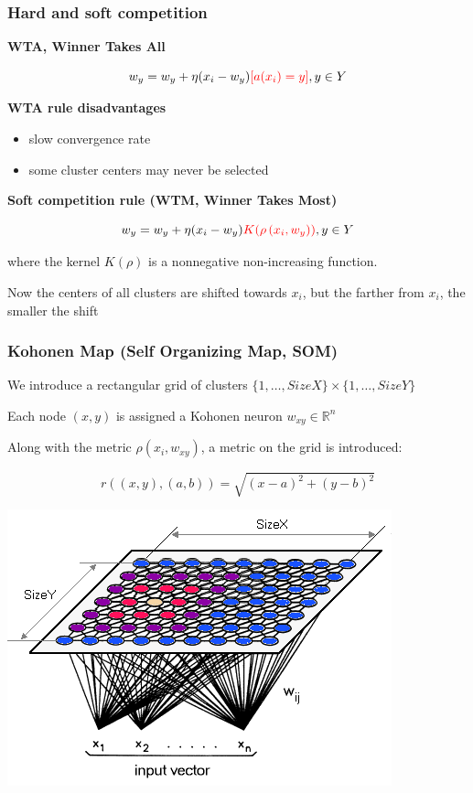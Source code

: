 \documentclass[fullscreen=true, bookmarks=true, hyperref={pdfencoding=unicode}]{beamer}
\begin{document}

\begin{frame}
\frametitle{Hard and soft competition}

   {\bf WTA, Winner Takes All}

   $$w_y = w_y + \eta(x_i-w_y){\color{red}[a(x_i)=y]}, y \in Y$$

   {\bf WTA rule disadvantages}
   \begin{itemize}
     \item slow convergence rate
     \item some cluster centers may never be selected
   \end{itemize}

   \pause
   {\bf Soft competition rule (WTM, Winner Takes Most)}

   $$w_y = w_y + \eta(x_i-w_y){\color{red}K(\rho\left(x_i, w_y)\right)}, y \in Y$$

   where the kernel $K(\rho)$ is a nonnegative non-increasing function.

   Now the centers of all clusters are shifted towards $x_i$, but the farther from $x_i$, the smaller the shift
\end{frame}


\begin{frame}
  \frametitle{Kohonen Map (Self Organizing Map, SOM)}

   We introduce a rectangular grid of clusters $\{1, \dots, SizeX\}\times \{1, \dots, SizeY\}$

   Each node $(x, y)$ is assigned a Kohonen neuron $w_{xy} \in \mathbb{R}^n$

   Along with the metric $\rho(x_i, w_{xy})$, a metric on the grid is introduced:

   $$ r((x, y),(a, b)) = \sqrt{(x - a)^2 + (y - b)^2}$$

   \begin{center}
     \includegraphics[keepaspectratio,
                      width=0.5\paperwidth]{kohonen-net-scheme.png}
   \end{center}
\end{frame}
\end{document}
